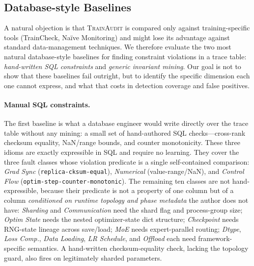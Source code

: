 
\subsection{Database-style Baselines}
\label{subsec:db-baselines}

A natural objection is that \textsc{TrainAudit} is compared only against training-specific tools (TrainCheck, Naïve Monitoring) and might lose its advantage against standard data-management techniques. We therefore evaluate the two most natural database-style baselines for finding constraint violations in a trace table: \emph{hand-written SQL constraints} and \emph{generic invariant mining}. Our goal is not to show that these baselines fail outright, but to identify the specific dimension each one cannot express, and what that costs in detection coverage and false positives.

\paragraph{Manual SQL constraints.} The first baseline is what a database engineer would write directly over the trace table without any mining: a small set of hand-authored SQL checks---cross-rank checksum equality, NaN/range bounds, and counter monotonicity. These three idioms are exactly expressible in SQL and require no learning. They cover the three fault classes whose violation predicate is a single self-contained comparison: \emph{Grad Sync} (\texttt{replica-cksum-equal}), \emph{Numerical} (value-range/NaN), and \emph{Control Flow} (\texttt{optim-step-counter-monotonic}). The remaining ten classes are not hand-expressible, because their predicate is not a property of one column but of a column \emph{conditioned on runtime topology and phase metadata} the author does not have: \emph{Sharding} and \emph{Communication} need the shard flag and process-group size; \emph{Optim State} needs the nested optimizer-state dict structure; \emph{Checkpoint} needs RNG-state lineage across save/load; \emph{MoE} needs expert-parallel routing; \emph{Dtype}, \emph{Loss Comp.}, \emph{Data Loading}, \emph{LR Schedule}, and \emph{Offload} each need framework-specific semantics. A hand-written checksum-equality check, lacking the topology guard, also fires on legitimately sharded parameters.

